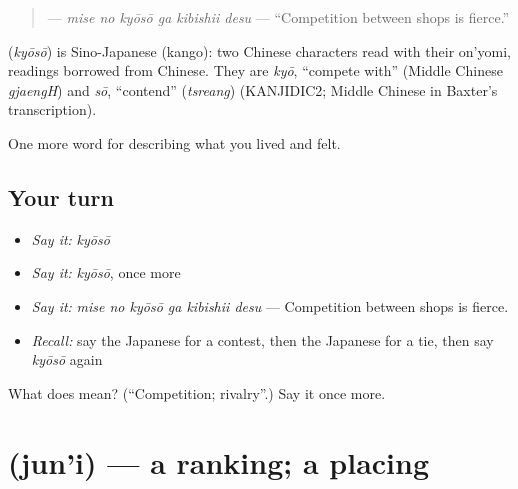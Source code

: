 \begin{quote}
\textbf{  } — \emph{mise no kyōsō ga kibishii desu} — \textquotedblleft{}Competition between shops is fierce.\textquotedblright{}
\end{quote}

\begin{cousinweb}
\textbf{} (\emph{kyōsō}) is Sino-Japanese (kango): two Chinese characters read with their on'yomi, readings borrowed from Chinese. They are \emph{kyō}, \textquotedblleft{}compete with\textquotedblright{} (Middle Chinese \emph{gjaengH}) and \emph{sō}, \textquotedblleft{}contend\textquotedblright{} (\emph{tsreang}) (KANJIDIC2; Middle Chinese in Baxter's transcription).
\end{cousinweb}

\begin{grammarlens}[title={What you've built}]
One more word for describing what you lived and felt.
\end{grammarlens}

\subsection*{Your turn}
\begin{itemize}
\raggedright
  \item \emph{Say it:} \emph{kyōsō}
  \item \emph{Say it:} \emph{kyōsō}, once more
  \item \emph{Say it:} \emph{mise no kyōsō ga kibishii desu} — Competition between shops is fierce.
  \item \emph{Recall:} say the Japanese for a contest, then the Japanese for a tie, then say \emph{kyōsō} again
\end{itemize}

\begin{tcolorbox}[breakable,colback=teal!4,colframe=teal!35!black,title={Before you move on}]
What does  mean? (\textquotedblleft{}Competition; rivalry\textquotedblright{}.) Say it once more.
\end{tcolorbox}
\section[\texorpdfstring{\ja{じゅんい} (jun'i)}{じゅんい (jun'i)}]{ (jun'i) — a ranking; a placing}

\label{lesson:JA-C462-jun-i}



